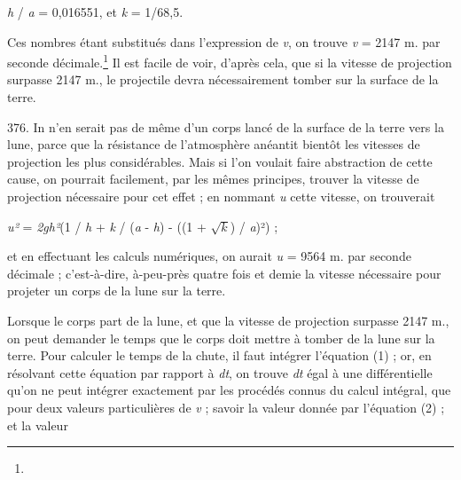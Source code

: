 \documentclass[a4paper, 11pt, oneside, polutonikogreek, french]{article}
\begin{document}
\begin{center}
\emph{h} / \emph{a} = 0,016551, et \emph{k} = 1/68,5.
\end{center}

Ces nombres étant substitués dans l'expression de \emph{v}, on trouve \emph{v} = 2147 m. par seconde décimale.\footnote{} Il est facile de voir, d'après cela, que si la vitesse de projection surpasse 2147 m., le projectile devra nécessairement tomber sur la surface de la terre.

376. In n'en serait pas de même d'un corps lancé de la surface de la terre vers la lune, parce que la résistance de l'atmosphère anéantit bientôt les vitesses de projection les plus considérables. Mais si l'on voulait faire abstraction de cette cause, on pourrait facilement, par les mêmes principes, trouver la vitesse de projection nécessaire pour cet effet ; en nommant \emph{u} cette vitesse, on trouverait

\begin{center}
\emph{u²} = \emph{2gh²}(1 / \emph{h} + \emph{k} / (\emph{a} - \emph{h}) - ((1 + $\sqrt{k}$) / \emph{a})²) ;
\end{center}

et en effectuant les calculs numériques, on aurait \emph{u} = 9564 m. par seconde décimale ; c'est-à-dire, à-peu-près quatre fois et demie la vitesse nécessaire pour projeter un corps de la lune sur la terre.

Lorsque le corps part de la lune, et que la vitesse de projection surpasse 2147 m., on peut demander le temps que le corps doit mettre à tomber de la lune sur la terre. Pour calculer le temps de la chute, il faut intégrer l'équation (1) ; or, en résolvant cette équation par rapport à \emph{dt}, on trouve \emph{dt} égal à une différentielle qu'on ne peut intégrer exactement par les procédés connus du calcul intégral, que pour deux valeurs particulières de \emph{v} ; savoir la valeur donnée par l'équation (2) ; et la valeur
\end{document}

